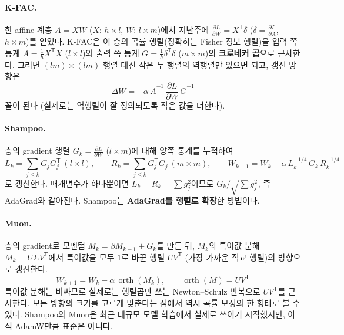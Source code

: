 \documentclass[11pt,a4paper]{article}
\newcommand{\T}{^{\mathsf T}}
\newcommand{\pd}[2]{\frac{\partial #1}{\partial #2}}
\begin{document}
\paragraph{K-FAC.}
한 affine 계층 $A=XW$ ($X$: $h\times l$, $W$: $l\times m$)에서
지난주에 $\pd{L}{W}=X\T\delta$ ($\delta=\pd{L}{A}$, $h\times m$)를 얻었다.
K-FAC은 이 층의 곡률 행렬(정확히는 Fisher 정보 행렬)을 입력 쪽 통계
$\bar A=\frac1h X\T X$ ($l\times l$)와 출력 쪽 통계 $\bar G=\frac1h\delta\T\delta$ ($m\times m$)의
\textbf{크로네커 곱}으로 근사한다. 그러면 $(lm)\times(lm)$ 행렬 대신 작은 두 행렬의 역행렬만 있으면 되고,
갱신 방향은
\[
\Delta W=-\alpha\,\bar A^{-1}\,\pd{L}{W}\,\bar G^{-1}
\]
꼴이 된다 (실제로는 역행렬이 잘 정의되도록 작은 값을 더한다).

\paragraph{Shampoo.}
층의 gradient 행렬 $G_k=\pd{L}{W}$ ($l\times m$)에 대해 양쪽 통계를 누적하여
\[
L_k=\sum_{j\le k}G_jG_j\T\ (l\times l),
\qquad
R_k=\sum_{j\le k}G_j\T G_j\ (m\times m),
\qquad
W_{k+1}=W_k-\alpha\,L_k^{-1/4}\,G_k\,R_k^{-1/4}
\]
로 갱신한다. 매개변수가 하나뿐이면 $L_k=R_k=\sum g_j^2$이므로 $G_k/\sqrt{\sum g_j^2}$,
즉 AdaGrad와 같아진다. Shampoo는 \textbf{AdaGrad를 행렬로 확장}한 방법이다.

\paragraph{Muon.}
층의 gradient로 모멘텀 $M_k=\beta M_{k-1}+G_k$를 만든 뒤,
$M_k$의 특이값 분해 $M_k=U\Sigma V\T$에서 특이값을 모두 $1$로 바꾼 행렬 $UV\T$
(가장 가까운 직교 행렬)의 방향으로 갱신한다.
\[
W_{k+1}=W_k-\alpha\,\operatorname{orth}(M_k),
\qquad
\operatorname{orth}(M)=UV\T
\]
특이값 분해는 비싸므로 실제로는 행렬곱만 쓰는 Newton--Schulz 반복으로 $UV\T$를 근사한다.
모든 방향의 크기를 고르게 맞춘다는 점에서 역시 곡률 보정의 한 형태로 볼 수 있다.
Shampoo와 Muon은 최근 대규모 모델 학습에서 실제로 쓰이기 시작했지만,
아직 AdamW만큼 표준은 아니다.
\end{document}
